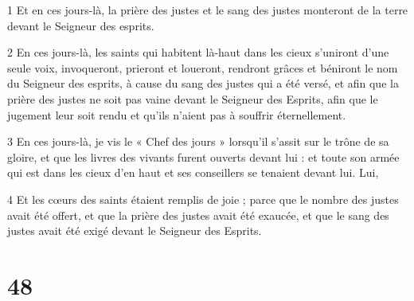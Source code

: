 \par 1 Et en ces jours-là, la prière des justes et le sang des justes monteront de la terre devant le Seigneur des esprits.
\par 2 En ces jours-là, les saints qui habitent là-haut dans les cieux s'uniront d'une seule voix, invoqueront, prieront et loueront, rendront grâces et béniront le nom du Seigneur des esprits, à cause du sang des justes qui a été versé, et afin que la prière des justes ne soit pas vaine devant le Seigneur des Esprits, afin que le jugement leur soit rendu et qu'ils n'aient pas à souffrir éternellement.
\par 3 En ces jours-là, je vis le « Chef des jours » lorsqu'il s'assit sur le trône de sa gloire, et que les livres des vivants furent ouverts devant lui : et toute son armée qui est dans les cieux d'en haut et ses conseillers se tenaient devant lui. Lui,
\par 4 Et les cœurs des saints étaient remplis de joie ; parce que le nombre des justes avait été offert, et que la prière des justes avait été exaucée, et que le sang des justes avait été exigé devant le Seigneur des Esprits.

\chapter{48}

